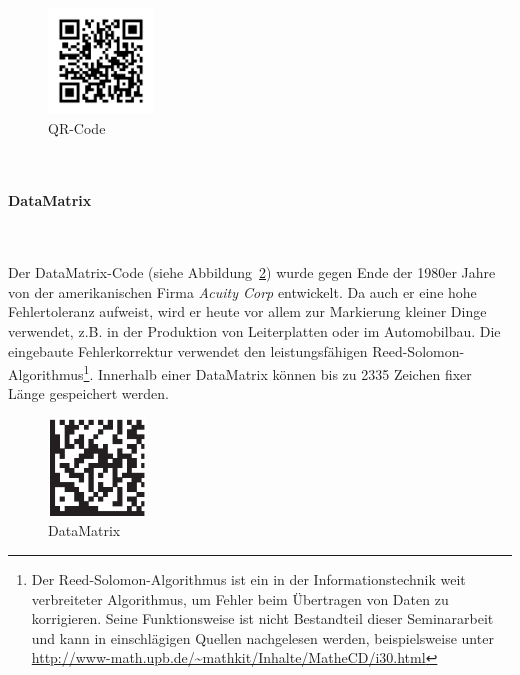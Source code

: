 \begin{figure}[htbp]%
	\centering
	\includegraphics[width=0.25\textwidth]{Bilder/QR_Code.png}
	\caption[QR-Code]{QR-Code\footnotemark}
	\label{fig:qrcode}	
\end{figure}~\\
\pagebreak
\paragraph{DataMatrix}~

Der DataMatrix-Code (siehe Abbildung~\ref{fig:datamatrix}) wurde gegen Ende der 1980er Jahre von der amerikanischen Firma \textit{Acuity Corp} entwickelt. Da auch er eine hohe Fehlertoleranz aufweist, wird er heute vor allem zur Markierung kleiner Dinge verwendet, z.B. in der Produktion von Leiterplatten oder im Automobilbau. Die eingebaute Fehlerkorrektur verwendet den leistungsfähigen Reed-Solomon-Algorithmus\footnote{Der Reed-Solomon-Algorithmus ist ein in der Informationstechnik weit verbreiteter Algorithmus, um Fehler beim Übertragen von Daten zu korrigieren. Seine Funktionsweise ist nicht Bestandteil dieser Seminararbeit und kann in einschlägigen Quellen nachgelesen werden, beispielsweise unter \url{http://www-math.upb.de/~mathkit/Inhalte/MatheCD/i30.html}}. Innerhalb einer DataMatrix können bis zu 2335 Zeichen fixer Länge gespeichert werden.

\begin{figure}[htbp]%
	\centering
	\includegraphics[width=0.23\textwidth]{Bilder/DataMatrix.png} 
	\caption[DataMatrix]{DataMatrix\footnotemark}
	\label{fig:datamatrix}	
\end{figure}

